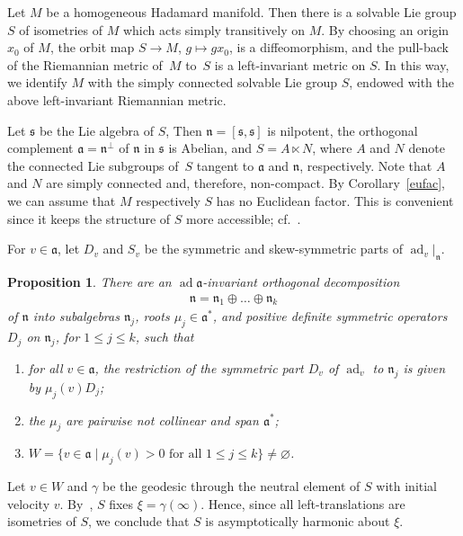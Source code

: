 \documentclass[pdftex]{sigma}
\numberwithin{equation}{section}
\newtheorem{Proposition}[Theorem]{Proposition}
\DeclareMathOperator{\ad}{ad}
\begin{document}
Let $M$ be a homogeneous Hadamard manifold.
Then there is a solvable Lie group $S$ of isometries of $M$ which acts simply transitively on $M$.
By choosing an origin $x_0$ of $M$,
the orbit map $S\to M$, $g\mapsto gx_0$, is a diffeomorphism,
and the pull-back of the Riemannian metric of~$M$ to~$S$ is a left-invariant metric on $S$.
In this way, we identify $M$ with the simply connected solvable Lie group $S$,
endowed with the above left-invariant Riemannian metric.

Let $\mathfrak s$ be the Lie algebra of $S$,
Then $\mathfrak n=[\mathfrak s, \mathfrak s]$ is nilpotent,
the orthogonal complement $\mathfrak a=\mathfrak n^\perp$ of $\mathfrak n$ in $\mathfrak s$ is Abelian,
and $S=A\ltimes N$,
where $A$ and $N$ denote the connected Lie subgroups of~$S$ tangent to $\mathfrak a$ and $\mathfrak n$,
respectively.
Note that $A$ and $N$ are simply connected and, therefore, non-compact.
By Corollary~\ref{eufac}, we can assume that $M$ respectively $S$ has no Euclidean factor.
This is convenient since it keeps the structure of $S$ more accessible; cf.~\cite[Section~1]{Wolter91}.

For $v\in\mathfrak a$,
let $D_v$ and $S_v$ be the symmetric and skew-symmetric parts of $\ad_v|_{\mathfrak n}$.

\begin{Proposition}%
There are an $\ad\mathfrak a$-invariant orthogonal decomposition
\begin{align*}
	\mathfrak n = \mathfrak n_1 \oplus\dots\oplus \mathfrak n_k
\end{align*}
 of $\mathfrak n$ into subalgebras $\mathfrak n_j$, \emph{roots} $\mu_j\in\mathfrak a^*$,
 and positive definite symmetric operators $D_j$ on $\mathfrak n_j$, for $1\le j\le k$, such that
\begin{enumerate}[label={\rm (\arabic*)}]\itemsep=0pt
\item\label{hh1}
for all $v\in\mathfrak a$, the restriction of the symmetric part $D_v$ of $\ad_v$ to $\mathfrak n_j$
is given by $\mu_j(v)D_j$;
\item%
the $\mu_j$ are pairwise not collinear and span $\mathfrak a^*$;
\item%
$W=\{v\in\mathfrak a \mid \text{$\mu_j(v)>0$ for all $1\le j\le k$} \}\ne\varnothing$.
\end{enumerate}
\end{Proposition}

Let $v\in W$ and $\gamma$ be the geodesic through the neutral element of $S$ with initial velocity $v$.
By~\cite[Proposition~3.3]{Wolter91}, $S$ fixes $\xi=\gamma(\infty)$.
Hence, since all left-translations are isometries of $S$, we conclude that $S$ is asymptotically harmonic about $\xi$.
\end{document}
